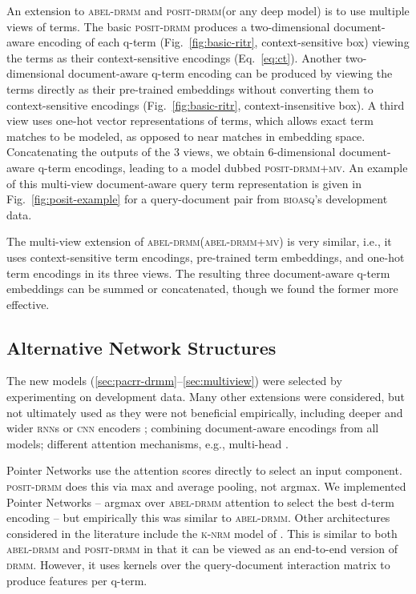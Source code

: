 \documentclass[11pt,a4paper]{article}
\newcommand{\rnn}{\textsc{rnn}\xspace}
\newcommand{\cnn}{\textsc{cnn}\xspace}
\newcommand{\bioasq}{\textsc{bioasq}\xspace}
\newcommand{\drmm}{\textsc{drmm}\xspace}
\newcommand{\abeldrmm}{\textsc{abel-drmm}\xspace}
\newcommand{\abeldrmmmv}{\textsc{abel-drmm+mv}\xspace}
\newcommand{\positdrmm}{\textsc{posit-drmm}\xspace}
\newcommand{\positdrmmmv}{\textsc{posit-drmm+mv}\xspace}
\begin{document}
An extension to \abeldrmm and \positdrmm (or any deep model) is to use multiple views of terms. The basic \positdrmm produces a two-dimensional document-aware encoding of each q-term (Fig.~\ref{fig:basic-ritr}, context-sensitive box) viewing the terms as their context-sensitive encodings (Eq.~\ref{eq:ct}). Another two-dimensional document-aware q-term encoding can be produced by viewing the terms directly as their pre-trained  embeddings without converting them to context-sensitive encodings (Fig.~\ref{fig:basic-ritr}, context-insensitive box). A third view uses one-hot vector representations of terms, which allows exact term matches to be modeled, as opposed to near matches in embedding space.
Concatenating the outputs of the 3 views, we obtain 6-dimensional document-aware q-term encodings, leading to a model dubbed \positdrmmmv. An example of this multi-view document-aware query term representation is given in Fig.~\ref{fig:posit-example} for a query-document pair from \bioasq's development data.

The multi-view extension of \abeldrmm (\abeldrmmmv) is very similar, i.e., it uses context-sensitive term encodings, pre-trained term embeddings, and one-hot term encodings in its three views. The resulting three document-aware q-term embeddings can be summed or concatenated, though we found the former more effective. 



\subsection{Alternative Network Structures}

The new models 
(\ref{sec:pacrr-drmm}--\ref{sec:multiview}) were selected by experimenting on development data. Many other extensions were considered, but not ultimately used as they were not beneficial empirically, including deeper and wider \rnn{s} or \cnn encoders \cite{bai2018empirical}; combining 
document-aware encodings from all models;  different attention mechanisms, e.g., multi-head \cite{vaswani2017attention}.

Pointer Networks \cite{vinyals2015pointer} use the attention 
scores directly to select an input component. 
\positdrmm does this via max and average pooling, not argmax.
We implemented Pointer Networks -- argmax over \abeldrmm attention to select the best d-term encoding -- but empirically this was similar to \abeldrmm.
Other architectures considered in the literature include the 
\textsc{k-nrm} model of . This 
is similar to both \abeldrmm and \positdrmm in that it can be viewed as an end-to-end version of \drmm. However, it uses kernels over the query-document interaction matrix to produce features per q-term.
\end{document}
